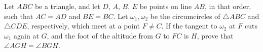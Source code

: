 Let $ABC$ be a triangle, and let $D$, $A$, $B$, $E$ be points on line $AB$, in that order, such that $AC=AD$ and $BE=BC$. Let $\omega_1, \omega_2$ be the circumcircles of $\triangle ABC$ and $\triangle CDE$, respectively, which meet at a point $F \neq C$.  If the tangent to $\omega_2$ at $F$ cuts $\omega_1$ again at $G$, and the foot of the altitude from $G$ to $FC$ is $H$, prove that $\angle AGH=\angle BGH$.

